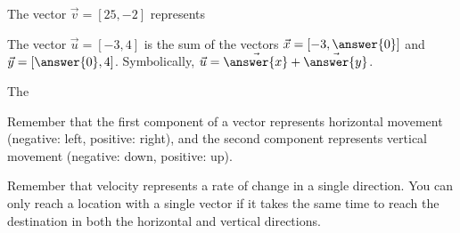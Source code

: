 \documentclass{ximera}
\begin{document}
\begin{problem}

The vector $\vec{v}=[25, -2]$ represents \begin{multipleChoice}
\end{multipleChoice}

The vector $\vec{u}=[-3,4]$ is the sum of the vectors $\vec{x}=[-3,\answer{0}]$ and $\vec{y}=[\answer{0},4]$. Symbolically, $\vec{u}=\vec{\answer{x}}+\vec{\answer{y}}$.

The 

\begin{feedback}
Remember that the first component of a vector represents horizontal movement (negative: left, positive: right), and the second component represents vertical movement (negative: down, positive: up).

Remember that velocity represents a rate of change in a single direction. You can only reach a location with a single vector if it takes the same time to reach the destination in both the horizontal and vertical directions.
\end{feedback}

\end{problem}
\end{document}
